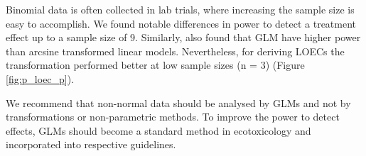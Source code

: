 \documentclass{scrartcl}
\begin{document}
Binomial data is often collected in lab trials, where increasing the sample size is easy to accomplish. 
We found notable differences in power to detect a treatment effect up to a sample size of 9.
Similarly, \citet{warton_arcsine_2011} also found that GLM have higher power than arcsine transformed linear models.
Nevertheless, for deriving LOECs the transformation performed better at low sample sizes (n = 3) (Figure \ref{fig:p_loec_p}). 

We recommend that non-normal data should be analysed by GLMs and not by transformations or non-parametric methods.
To improve the power to detect effects, GLMs should become a standard method in ecotoxicology and incorporated into respective guidelines.





\end{document}
